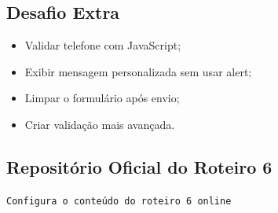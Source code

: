 \documentclass[12pt,a4paper]{article}
\begin{document}

\subsection{Desafio Extra}

\begin{boxAtividade}

\begin{itemize}
\item Validar telefone com JavaScript;
\item Exibir mensagem personalizada sem usar alert;
\item Limpar o formulário após envio;
\item Criar validação mais avançada.
\end{itemize}

\end{boxAtividade}

\newpage




\subsection{Repositório Oficial do Roteiro 6}

\begin{tcolorbox}[
colback=azulTitulo!5,
colframe=azulTitulo,
title=\textbf{Repositório Oficial do Roteiro 6}
]

\begin{center}
\end{center}

\begin{center}
\texttt{Configura o conteúdo do roteiro 6 online}
\end{center}

\end{tcolorbox}



\newpage






\end{document}
